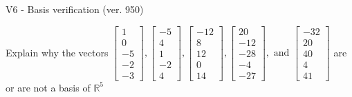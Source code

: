 \begin{exercise}
  \begin{exerciseTitle}V6 - Basis verification (ver. 950)\end{exerciseTitle}
  \begin{exerciseStatement}
    Explain why the vectors \(\left[\begin{array}{r}
1 \\
0 \\
-5 \\
-2 \\
-3
\end{array}\right] , \left[\begin{array}{r}
-5 \\
4 \\
1 \\
-2 \\
4
\end{array}\right] , \left[\begin{array}{r}
-12 \\
8 \\
12 \\
0 \\
14
\end{array}\right] , \left[\begin{array}{r}
20 \\
-12 \\
-28 \\
-4 \\
-27
\end{array}\right] , \text{ and } \left[\begin{array}{r}
-32 \\
20 \\
40 \\
4 \\
41
\end{array}\right]\) are or are not a basis of \(\mathbb{R}^5\)	



\end{exerciseStatement}
\end{exercise}
